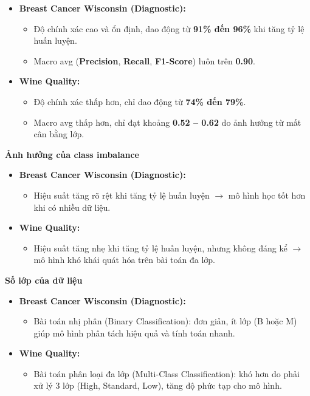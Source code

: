 \begin{itemize}
	\item \textbf{Breast Cancer Wisconsin (Diagnostic):}
	\begin{itemize}
		\item Độ chính xác cao và ổn định, dao động từ \textbf{91\% đến 96\%} khi tăng tỷ lệ huấn luyện.
		\item Macro avg (\textbf{Precision}, \textbf{Recall}, \textbf{F1-Score}) luôn trên \textbf{0.90}.
	\end{itemize}
	\item \textbf{Wine Quality:}
	\begin{itemize}
		\item Độ chính xác thấp hơn, chỉ dao động từ \textbf{74\% đến 79\%}.
		\item Macro avg thấp hơn, chỉ đạt khoảng \textbf{0.52 -- 0.62} do ảnh hưởng từ mất cân bằng lớp.
	\end{itemize}
\end{itemize}



\textbf{Ảnh hưởng của class imbalance}
\begin{itemize}
	\item \textbf{Breast Cancer Wisconsin (Diagnostic):}
	\begin{itemize}
		\item Hiệu suất tăng rõ rệt khi tăng tỷ lệ huấn luyện $\rightarrow$ mô hình học tốt hơn khi có nhiều dữ liệu.
	\end{itemize}
	\item \textbf{Wine Quality:}
	\begin{itemize}
		\item Hiệu suất tăng nhẹ khi tăng tỷ lệ huấn luyện, nhưng không đáng kể $\rightarrow$ mô hình khó khái quát hóa trên bài toán đa lớp.
	\end{itemize}
\end{itemize}

\textbf{Số lớp của dữ liệu}

\begin{itemize}
	\item \textbf{Breast Cancer Wisconsin (Diagnostic):}
	\begin{itemize}
		\item Bài toán nhị phân (Binary Classification): đơn giản, ít lớp (B hoặc M) giúp mô hình phân tách hiệu quả và tính toán nhanh.
	\end{itemize}
	\item \textbf{Wine Quality:}
	\begin{itemize}
		\item Bài toán phân loại đa lớp (Multi-Class Classification): khó hơn do phải xử lý 3 lớp (High, Standard, Low), tăng độ phức tạp cho mô hình.
	\end{itemize}
\end{itemize}

